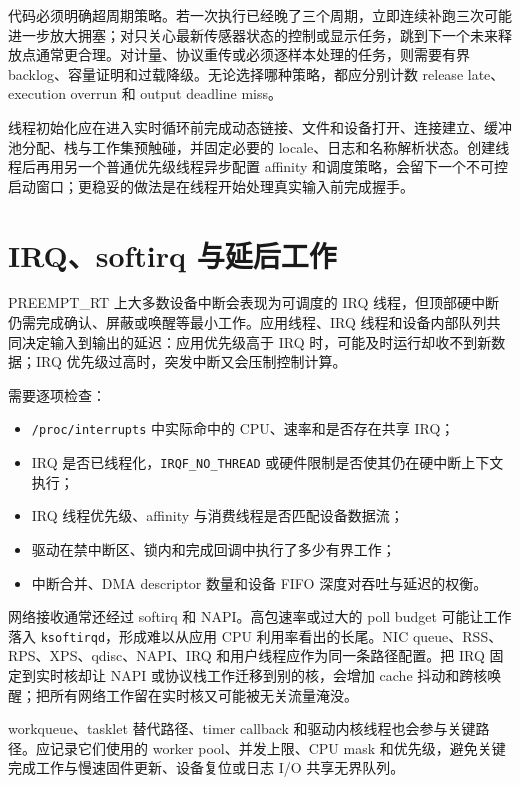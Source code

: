 代码必须明确超周期策略。若一次执行已经晚了三个周期，立即连续补跑三次可能进一步放大拥塞；对只关心最新传感器状态的控制或显示任务，跳到下一个未来释放点通常更合理。对计量、协议重传或必须逐样本处理的任务，则需要有界 backlog、容量证明和过载降级。无论选择哪种策略，都应分别计数 release late、execution overrun 和 output deadline miss。

线程初始化应在进入实时循环前完成动态链接、文件和设备打开、连接建立、缓冲池分配、栈与工作集预触碰，并固定必要的 locale、日志和名称解析状态。创建线程后再用另一个普通优先级线程异步配置 affinity 和调度策略，会留下一个不可控启动窗口；更稳妥的做法是在线程开始处理真实输入前完成握手。

\section{IRQ、softirq 与延后工作}

PREEMPT\_RT 上大多数设备中断会表现为可调度的 IRQ 线程，但顶部硬中断仍需完成确认、屏蔽或唤醒等最小工作。应用线程、IRQ 线程和设备内部队列共同决定输入到输出的延迟：应用优先级高于 IRQ 时，可能及时运行却收不到新数据；IRQ 优先级过高时，突发中断又会压制控制计算。

需要逐项检查：

\begin{itemize}
  \item \texttt{/proc/interrupts} 中实际命中的 CPU、速率和是否存在共享 IRQ；
  \item IRQ 是否已线程化，\texttt{IRQF\_NO\_THREAD} 或硬件限制是否使其仍在硬中断上下文执行；
  \item IRQ 线程优先级、affinity 与消费线程是否匹配设备数据流；
  \item 驱动在禁中断区、锁内和完成回调中执行了多少有界工作；
  \item 中断合并、DMA descriptor 数量和设备 FIFO 深度对吞吐与延迟的权衡。
\end{itemize}

网络接收通常还经过 softirq 和 NAPI。高包速率或过大的 poll budget 可能让工作落入 \texttt{ksoftirqd}，形成难以从应用 CPU 利用率看出的长尾。NIC queue、RSS、RPS、XPS、qdisc、NAPI、IRQ 和用户线程应作为同一条路径配置。把 IRQ 固定到实时核却让 NAPI 或协议栈工作迁移到别的核，会增加 cache 抖动和跨核唤醒；把所有网络工作留在实时核又可能被无关流量淹没。

workqueue、tasklet 替代路径、timer callback 和驱动内核线程也会参与关键路径。应记录它们使用的 worker pool、并发上限、CPU mask 和优先级，避免关键完成工作与慢速固件更新、设备复位或日志 I/O 共享无界队列。

